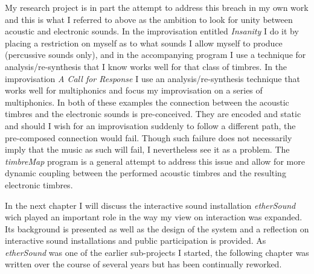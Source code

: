 
My research project is in part the attempt to address this breach in my own work and this is what I referred to above as the ambition to look for unity between acoustic and electronic sounds. In the improvisation entitled \emph{Insanity} I do it by placing a restriction on myself as to what sounds I allow myself to produce (percussive sounds only), and in the accompanying program I use a technique for analysis/re-synthesis that I know works well for that class of timbres. In the improvisation \emph{A Call for Response} I use an analysis/re-synthesis technique that works well for multiphonics and focus my improvisation on a series of multiphonics.  In both of these examples the connection between the acoustic timbres and the electronic sounds is pre-conceived. They are encoded and static and should I wish for an improvisation suddenly to follow a different path, the pre-composed connection would fail. Though such failure does not necessarily imply that the music as such will fail, I nevertheless see it as a problem. The \emph{timbreMap} program is a general attempt to address this issue and allow for more dynamic coupling between the performed acoustic timbres and the resulting electronic timbres.

In the next chapter I will discuss the interactive sound installation \emph{etherSound} wich played an important role in the way my view on interaction was expanded. Its background is presented as well as the design of the system and a reflection on interactive sound installations and public participation is provided. As \emph{etherSound} was one of the earlier sub-projects I started, the following chapter was written over the course of several years but has been continually reworked. 
\newpage
\thispagestyle{empty}


